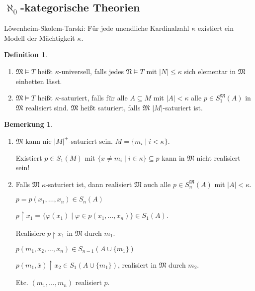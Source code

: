 \documentclass[12pt,parskip=full]{scrartcl}
\newcommand{\abs}[1]{{\left| #1 \right|}}
\theoremstyle{definition}
\newtheorem{definition}[theorem]{Definition}
\newtheorem{remark}[theorem]{Bemerkung}
\begin{document}
	\subsection{\texorpdfstring{$\aleph_0$}{Aleph 0}-kategorische Theorien}
	
	Löwenheim-Skolem-Tarski: Für jede unendliche Kardinalzahl $\kappa$ existiert ein Modell der Mächtigkeit $\kappa$.
	
	\begin{definition}
		\begin{enumerate}
			\item $\mathfrak{M} \models T$ heißt $\kappa$-universell, falls jedes $\mathfrak{N} \models T$ mit $\abs{N} \leq \kappa$ sich elementar in $\mathfrak{M}$ einbetten lässt.
			\item $\mathfrak{M} \models T$ heißt $\kappa$-saturiert, falls für alle $A \subseteq M$ mit $\abs{A} < \kappa$ alle $p \in S_1^\mathfrak{M}(A)$ in $\mathfrak{M}$ realisiert sind. $\mathfrak{M}$ heißt saturiert, falls $\mathfrak{M}$ $\abs{M}$-saturiert ist.
		\end{enumerate}
	\end{definition}

	\begin{remark}
		\begin{enumerate}
			\item $\mathfrak{M}$ kann nie $\abs{M}^+$-saturiert sein. $M = \{ m_i \mid i < \kappa \}$.
		
			Existiert $p \in S_1(M)$ mit $\{ x \neq m_i \mid i \in \kappa \} \subseteq p$ kann in $\mathfrak{M}$ nicht realisiert sein!
			
			\item Falls $\mathfrak{M}$ $\kappa$-saturiert ist, dann realisiert $\mathfrak{M}$ auch alle $p \in S_n^\mathfrak{M}(A)$ mit $\abs{A} < \kappa$.
			
			$p = p(x_1, \dots, x_n) \in S_n(A)$
			
			$p \upharpoonright x_1 = \{ \varphi(x_1) \mid \varphi \in p(x_1, \dots, x_n) \} \in S_1(A)$.
			
			Realisiere $p \upharpoonright x_1$ in $\mathfrak{M}$ durch $m_1$.
			
			$p(m_1, x_2, \dots, x_n) \in S_{n-1}(A \cup \{ m_1 \})$
			
			$p(m_1, \overline{x}) \upharpoonright x_2 \in S_1(A \cup \{ m_1 \})$, realisiert in $\mathfrak{M}$ durch $m_2$.
			
			Etc. $(m_1, \dots, m_n)$ realisiert $p$.
		\end{enumerate}
	\end{remark}
\end{document}
